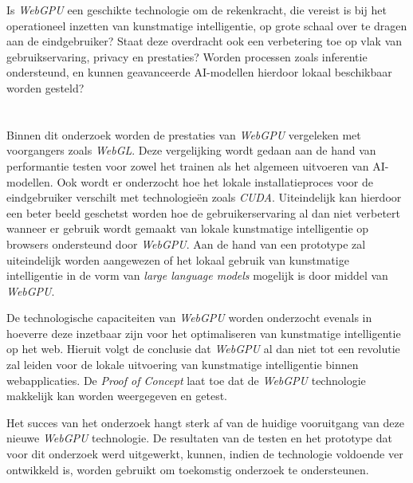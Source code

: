 Is \textit{WebGPU} een geschikte technologie om de rekenkracht, die vereist is bij het operationeel inzetten van kunstmatige intelligentie, op grote schaal over te dragen aan de eindgebruiker? Staat deze overdracht ook een verbetering toe op vlak van gebruikservaring, privacy en prestaties? Worden processen zoals inferentie ondersteund, en kunnen geavanceerde AI-modellen hierdoor lokaal beschikbaar worden gesteld?

\section{}%
\label{sec:onderzoeksdoelstelling}


Binnen dit onderzoek worden de prestaties van \textit{WebGPU} vergeleken met voorgangers zoals \textit{WebGL}. Deze vergelijking wordt gedaan aan de hand van performantie testen voor zowel het trainen als het algemeen uitvoeren van AI-modellen. Ook wordt er onderzocht hoe het lokale installatieproces voor de eindgebruiker verschilt met technologieën zoals \textit{CUDA}. Uiteindelijk kan hierdoor een beter beeld geschetst worden hoe de gebruikerservaring al dan niet verbetert wanneer er gebruik wordt gemaakt van lokale kunstmatige intelligentie op browsers ondersteund door \textit{WebGPU}. Aan de hand van een prototype zal uiteindelijk worden aangewezen of het lokaal gebruik van kunstmatige intelligentie in de vorm van \textit{large language models} mogelijk is door middel van \textit{WebGPU}.

\bigbreak{}

De technologische capaciteiten van \textit{WebGPU} worden onderzocht evenals in hoeverre deze inzetbaar zijn voor het optimaliseren van kunstmatige intelligentie op het web. Hieruit volgt de conclusie dat \textit{WebGPU} al dan niet tot een revolutie zal leiden voor de lokale uitvoering van kunstmatige intelligentie binnen web\-app\-li\-ca\-ties. De \textit{Proof of Concept} laat toe dat de \textit{WebGPU} technologie makkelijk kan worden weergegeven en getest.

\bigbreak{}

Het succes van het onderzoek hangt sterk af van de huidige vooruitgang van deze nieuwe \textit{WebGPU} technologie. De resultaten van de testen en het prototype dat voor dit onderzoek werd uitgewerkt, kunnen, indien de technologie voldoende ver ontwikkeld is, worden gebruikt om toekomstig onderzoek te ondersteunen.

